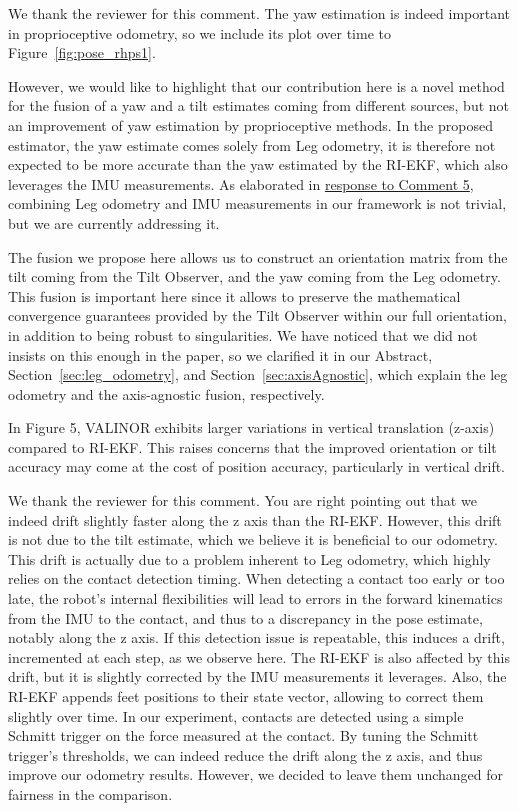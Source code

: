 We thank the reviewer for this comment. The yaw estimation is indeed important in proprioceptive odometry, so we include its plot over time to Figure~\ref{fig:pose_rhps1}.

However, we would like to highlight that our contribution here is a novel method for the fusion of a yaw and a tilt estimates coming from different sources, but not an improvement of yaw estimation by proprioceptive methods. In the proposed estimator, the yaw estimate comes solely from Leg odometry, it is therefore not expected to be more accurate than the yaw estimated by the RI-EKF, which also leverages the IMU measurements. As elaborated in \hyperlink{CommentSe3Fusion}{response to Comment 5}, combining Leg odometry and IMU measurements in our framework is not trivial, but we are currently addressing it.

The fusion we propose here allows us to construct an orientation matrix from the tilt coming from the Tilt Observer, and the yaw coming from the Leg odometry.
This fusion is important here since it allows to preserve the mathematical convergence guarantees provided by the Tilt Observer within our full orientation, in addition to being robust to singularities. 
We have noticed that we did not insists on this enough in the paper, so we clarified it in our Abstract, Section~\ref{sec:leg_odometry}, and Section~\ref{sec:axisAgnostic}, which explain the leg odometry and the axis-agnostic fusion, respectively.



\begin{revquote}
In Figure 5, VALINOR exhibits larger variations in vertical translation (z-axis) compared to RI-EKF. This raises concerns that the improved orientation or tilt accuracy may come at the cost of position accuracy, particularly in vertical drift.
\end{revquote}

We thank the reviewer for this comment. You are right pointing out that we indeed drift slightly faster along the z axis than the RI-EKF.
However, this drift is not due to the tilt estimate, which we believe it is beneficial to our odometry. 
This drift is actually due to a problem inherent to Leg odometry, which highly relies on the contact detection timing. When detecting a contact too early or too late, the robot's internal flexibilities will lead to errors in the forward kinematics from the IMU to the contact, and thus to a discrepancy in the pose estimate, notably along the z axis. If this detection issue is repeatable, this induces a drift, incremented at each step, as we observe here.
The RI-EKF is also affected by this drift, but it is slightly corrected by the IMU measurements it leverages. Also, the RI-EKF appends feet positions to their state vector, allowing to correct them slightly over time. In our experiment, contacts are detected using a simple Schmitt trigger on the force measured at the contact. By tuning the Schmitt trigger's thresholds, we can indeed reduce the drift along the z axis, and thus improve our odometry results. However, we decided to leave them unchanged for fairness in the comparison. 


